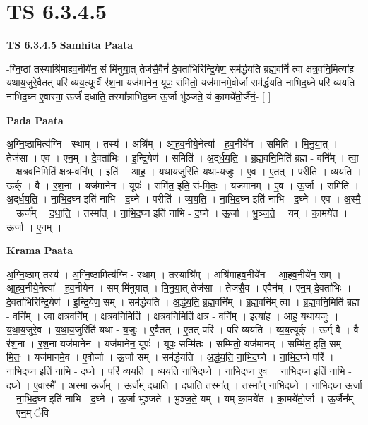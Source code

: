 \documentclass[17pt]{extarticle}
\begin{document}
\section{ TS 6.3.4.5 }

\textbf{TS 6.3.4.5 } \newline
\textbf{Samhita Paata} \newline

-ग्नि॒ष्ठां तस्याश्रि॑माहव॒नीये॑न॒ सं मि॑नुया॒त् तेज॑सै॒वैनं॑ दे॒वता॑भिरिन्द्रि॒येण॒ सम॑र्द्धयति ब्रह्म॒वनिं॑ त्वा क्षत्र॒वनि॒मित्या॑ह यथाय॒जुरे॒वैतत् परि॑ व्यय॒त्यूर्ग्वै र॑श॒ना यज॑मानेन॒ यूपः॒ संमि॑तो॒ यज॑मानमे॒वोर्जा सम॑र्द्धयति नाभिद॒घ्ने परि॑ व्ययति नाभिद॒घ्न ए॒वास्मा॒ ऊर्जं॑ दधाति॒ तस्मा᳚न्नाभिद॒घ्न ऊ॒र्जा भु॑ञ्जते॒ यं का॒मये॑तो॒र्जैनं॒- [  ] \newline

\textbf{Pada Paata} \newline

अ॒ग्नि॒ष्ठामित्य॑ग्नि - स्थाम् । तस्य॑ । अश्रि᳚म् । आ॒ह॒व॒नीये॒नेत्या᳚ - ह॒व॒नीये॑न । समिति॑ । मि॒नु॒या॒त् । तेज॑सा । ए॒व । ए॒न॒म् । दे॒वता॑भिः । इ॒न्द्रि॒येण॑ । समिति॑ । अ॒द्‌र्ध॒य॒ति॒ । ब्र॒ह्म॒वनि॒मिति॑ ब्रह्म - वनि᳚म् । त्वा॒ । क्ष॒त्र॒वनि॒मिति॑ क्षत्र-वनि᳚म् । इति॑ । आ॒ह॒ । य॒था॒य॒जुरिति॑ यथा-य॒जुः । ए॒व । ए॒तत् । परीति॑ । व्य॒य॒ति॒ । ऊर्क् । वै । र॒श॒ना । यज॑मानेन । यूपः॑ । संमि॑त॒ इति॒ सं-मि॒तः॒ । यज॑मानम् । ए॒व । ऊ॒र्जा । समिति॑ । अ॒द्‌र्ध॒य॒ति॒ । ना॒भि॒द॒घ्न इति॑ नाभि - द॒घ्ने । परीति॑ । व्य॒य॒ति॒ । ना॒भि॒द॒घ्न इति॑ नाभि - द॒घ्ने । ए॒व । अ॒स्मै॒ । ऊर्ज᳚म् । द॒धा॒ति॒ । तस्मा᳚त् । ना॒भि॒द॒घ्न इति॑ नाभि - द॒घ्ने । ऊ॒र्जा । भु॒ञ्ज॒ते॒ । यम् । का॒मये॑त । ऊ॒र्जा । ए॒न॒म् ।  \newline


\textbf{Krama Paata} \newline

अ॒ग्नि॒ष्ठाम् तस्य॑ । अ॒ग्नि॒ष्ठामित्य॑ग्नि - स्थाम् । तस्याश्रि᳚म् । अश्रि॑माहव॒नीये॑न । आ॒ह॒व॒नीये॑न॒ सम् । आ॒ह॒व॒नीये॒नेत्या᳚ - ह॒व॒नीये॑न । सम् मि॑नुयात् । मि॒नु॒या॒त् तेज॑सा । तेज॑सै॒व । ए॒वैन᳚म् । ए॒न॒म् दे॒वता॑भिः । दे॒वता॑भिरिन्द्रि॒येण॑ । इ॒न्द्रि॒येण॒ सम् । सम॑र्द्धयति । अ॒र्द्ध॒य॒ति॒ ब्र॒ह्म॒वनि᳚म् । ब्र॒ह्म॒वनि॑म् त्वा । ब्र॒ह्म॒वनि॒मिति॑ ब्रह्म - वनि᳚म् । त्वा॒ क्ष॒त्र॒वनि᳚म् । क्ष॒त्र॒वनि॒मिति॑ । क्ष॒त्र॒वनि॒मिति॑ क्षत्र - वनि᳚म् । इत्या॑ह । आ॒ह॒ य॒था॒य॒जुः । य॒था॒य॒जुरे॒व । य॒था॒य॒जुरिति॑ यथा - य॒जुः । ए॒वैतत् । ए॒तत् परि॑ । परि॑ व्ययति । व्य॒य॒त्यूर्क् । ऊर्ग् वै । वै र॑श॒ना । र॒श॒ना यज॑मानेन । यज॑मानेन॒ यूपः॑ । यूपः॒ सम्मि॑तः । सम्मि॑तो॒ यज॑मानम् । सम्मि॑त॒ इति॒ सम् - मि॒तः॒ । यज॑मानमे॒व । ए॒वोर्जा । ऊ॒र्जा सम् । सम॑र्द्धयति । अ॒र्द्ध॒य॒ति॒ ना॒भि॒द॒घ्ने । ना॒भि॒द॒घ्ने परि॑ । ना॒भि॒द॒घ्न इति॑ नाभि - द॒घ्ने । परि॑ व्ययति । व्य॒य॒ति॒ ना॒भि॒द॒घ्ने । ना॒भि॒द॒घ्न ए॒व । ना॒भि॒द॒घ्न इति॑ नाभि - द॒घ्ने । ए॒वास्मै᳚ । अस्मा॒ ऊर्ज᳚म् । ऊर्ज॑म् दधाति । द॒धा॒ति॒ तस्मा᳚त् । तस्मा᳚न् नाभिद॒घ्ने । ना॒भि॒द॒घ्न ऊ॒र्जा । ना॒भि॒द॒घ्न इति॑ नाभि - द॒घ्ने । ऊ॒र्जा भु॑ञ्जते । भु॒ञ्ज॒ते॒ यम् । यम् का॒मये॑त । का॒मये॑तो॒र्जा । ऊ॒र्जैन᳚म् । ए॒न॒म् ॅवि \newline
\end{document}
